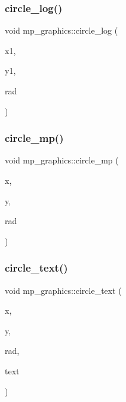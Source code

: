 \subsubsection{\texorpdfstring{circle\+\_\+log()}{circle\_log()}}
{\footnotesize\ttfamily void mp\+\_\+graphics\+::circle\+\_\+log (\begin{DoxyParamCaption}\item[{\mbox{\hyperlink{galois_8h_a09fddde158a3a20bd2dcadb609de11dc}{I\+NT}}}]{x1,  }\item[{\mbox{\hyperlink{galois_8h_a09fddde158a3a20bd2dcadb609de11dc}{I\+NT}}}]{y1,  }\item[{\mbox{\hyperlink{galois_8h_a09fddde158a3a20bd2dcadb609de11dc}{I\+NT}}}]{rad }\end{DoxyParamCaption})}

\mbox{\label{classmp__graphics_af45ff3b26ab8578a58b17b3507578fc2}} 
\subsubsection{\texorpdfstring{circle\+\_\+mp()}{circle\_mp()}}
{\footnotesize\ttfamily void mp\+\_\+graphics\+::circle\+\_\+mp (\begin{DoxyParamCaption}\item[{\mbox{\hyperlink{galois_8h_a09fddde158a3a20bd2dcadb609de11dc}{I\+NT}}}]{x,  }\item[{\mbox{\hyperlink{galois_8h_a09fddde158a3a20bd2dcadb609de11dc}{I\+NT}}}]{y,  }\item[{\mbox{\hyperlink{galois_8h_a09fddde158a3a20bd2dcadb609de11dc}{I\+NT}}}]{rad }\end{DoxyParamCaption})}

\mbox{\label{classmp__graphics_aa50563fd445efab70c7abc5700c6049b}} 
\subsubsection{\texorpdfstring{circle\+\_\+text()}{circle\_text()}}
{\footnotesize\ttfamily void mp\+\_\+graphics\+::circle\+\_\+text (\begin{DoxyParamCaption}\item[{\mbox{\hyperlink{galois_8h_a09fddde158a3a20bd2dcadb609de11dc}{I\+NT}}}]{x,  }\item[{\mbox{\hyperlink{galois_8h_a09fddde158a3a20bd2dcadb609de11dc}{I\+NT}}}]{y,  }\item[{\mbox{\hyperlink{galois_8h_a09fddde158a3a20bd2dcadb609de11dc}{I\+NT}}}]{rad,  }\item[{const char $\ast$}]{text }\end{DoxyParamCaption})}

